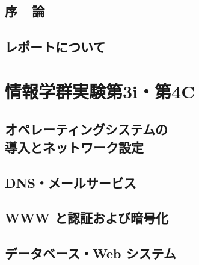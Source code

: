 \documentclass[10pt]{text2002}
\title{}
\author{}
\date{}
\begin{document}
\sloppy
\maketitle
\chapter*{序~~論}\label{chapter:introduction}

\clearpage
\chapter*{レポートについて}\label{chapter:report}


 \tableofcontents
\clearpage


\part{情報学群実験第3i・第4C}\label{part:1}

\chapter[オペレーティングシステムの導入とネットワーク設定]
{オペレーティングシステムの\\導入とネットワーク設定}\label{ch:os}
\def\chapos{01_1_os/}

\def\chapnet{01_1_os/}


\chapter{DNS・メールサービス}\label{ch:dns}
\def\chapdns{01_2_dns_mail/}

\def\chapmail{01_2_dns_mail/}


\chapter{WWW と認証および暗号化}
\def\chapwww{02_1_http_auth_crypt/}


\chapter{データベース・Web システム}
\def\chapdb{02_2_database_websystem/}

\end{document}
